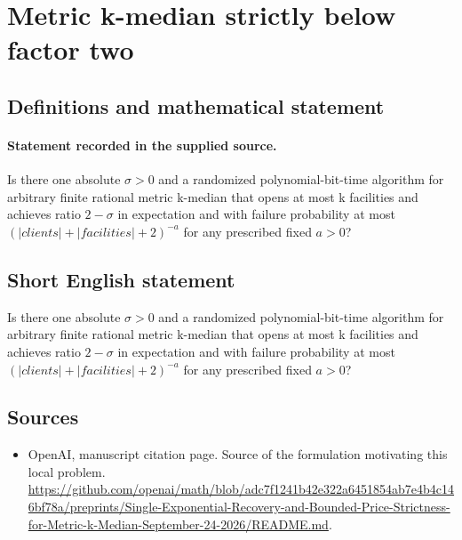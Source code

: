 \documentclass[11pt]{article}
\begin{document}
\section*{Metric k-median strictly below factor two}\label{30007466}
\subsection{Definitions and mathematical statement}
\paragraph{Statement recorded in the supplied source.}
Is there one absolute $\sigma >0$ and a randomized polynomial-bit-time algorithm for arbitrary finite rational metric k-median that opens at most k facilities and achieves ratio $2-\sigma $ in expectation and with failure probability at most $(|clients|+|facilities|+2)^{-a}$ for any prescribed fixed $a>0$?
\subsection{Short English statement}
Is there one absolute $\sigma >0$ and a randomized polynomial-bit-time algorithm for arbitrary finite rational metric k-median that opens at most k facilities and achieves ratio $2-\sigma $ in expectation and with failure probability at most $(|clients|+|facilities|+2)^{-a}$ for any prescribed fixed $a>0$?
\subsection{Sources}
\begin{itemize}
\item[S1] OpenAI, manuscript citation page. Source of the formulation motivating this local problem.
\url{https://github.com/openai/math/blob/adc7f1241b42e322a6451854ab7e4b4c146bf78a/preprints/Single-Exponential-Recovery-and-Bounded-Price-Strictness-for-Metric-k-Median-September-24-2026/README.md}.
\end{itemize}
\end{document}
